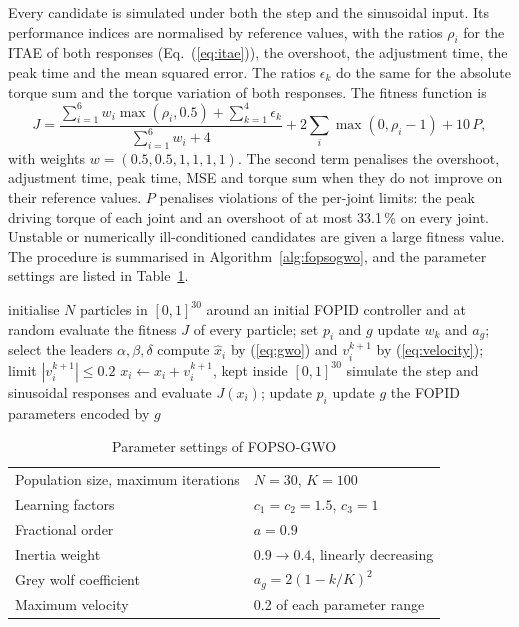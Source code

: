 \documentclass{svproc}
\begin{document}
Every candidate is simulated under both the step and the sinusoidal input. Its performance
indices are normalised by reference values, with the ratios $\rho_i$ for the ITAE of both
responses (Eq.~(\ref{eq:itae})), the overshoot, the adjustment time, the peak time and the
mean squared error. The ratios $\epsilon_k$ do the same for the absolute torque sum and the
torque variation of both responses. The fitness function is
\begin{equation}
  J = \frac{\sum_{i=1}^{6} w_i \max(\rho_i, 0.5) + \sum_{k=1}^{4} \epsilon_k}{\sum_{i=1}^{6} w_i + 4}
      + 2 \sum_{i} \max(0, \rho_i - 1) + 10\, P ,
  \label{eq:fitness}
\end{equation}
with weights $w = (0.5, 0.5, 1, 1, 1, 1)$. The second term penalises the overshoot,
adjustment time, peak time, MSE and torque sum when they do not improve on their reference
values. $P$ penalises violations of the per-joint limits: the peak driving torque of each
joint and an overshoot of at most 33.1\,\% on every joint. Unstable or numerically
ill-conditioned candidates are given a large fitness value. The procedure is summarised in Algorithm~\ref{alg:fopsogwo}, and the parameter
settings are listed in Table~\ref{tab:settings}.

\begin{algorithm}[!htb]
\caption{FOPSO-GWO for FOPID parameter tuning}
\label{alg:fopsogwo}
\begin{algorithmic}[1]
\State initialise $N$ particles in $[0,1]^{30}$ around an initial FOPID controller and at random
\State evaluate the fitness $J$ of every particle; set $p_i$ and $g$
  \State update $w_k$ and $a_g$; select the leaders $\alpha, \beta, \delta$
    \State compute $\hat x_i$ by (\ref{eq:gwo}) and $v_i^{k+1}$ by (\ref{eq:velocity});
           limit $|v_i^{k+1}| \le 0.2$
    \State $x_i \gets x_i + v_i^{k+1}$, kept inside $[0,1]^{30}$
    \State simulate the step and sinusoidal responses and evaluate $J(x_i)$; update $p_i$
  \EndFor
  \State update $g$
\EndFor
\State \Return the FOPID parameters encoded by $g$
\end{algorithmic}
\end{algorithm}

\begin{table}[!htb]
\caption{Parameter settings of FOPSO-GWO}
\label{tab:settings}
\centering
\begin{tabular}{ll}
\toprule
Population size, maximum iterations & $N = 30$, $K = 100$\\
Learning factors & $c_1 = c_2 = 1.5$, $c_3 = 1$\\
Fractional order & $a = 0.9$\\
Inertia weight & $0.9 \to 0.4$, linearly decreasing\\
Grey wolf coefficient & $a_g = 2(1 - k/K)^2$\\
Maximum velocity & 0.2 of each parameter range\\
\bottomrule
\end{tabular}
\end{table}
\end{document}
